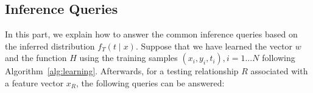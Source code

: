 

\subsection{Inference Queries}
In this part, we explain how to answer the common inference queries based on the inferred distribution $f_T(t\mid x)$. Suppose that we have learned the vector ${w}$ and the function ${H}$ using the training samples $(x_i, y_i, t_i), i=1\dots N$ following Algorithm~\ref{alg:learning}. Afterwards, for a testing relationship $R$ associated with a feature vector $x_R$, the following queries can be answered:\\


